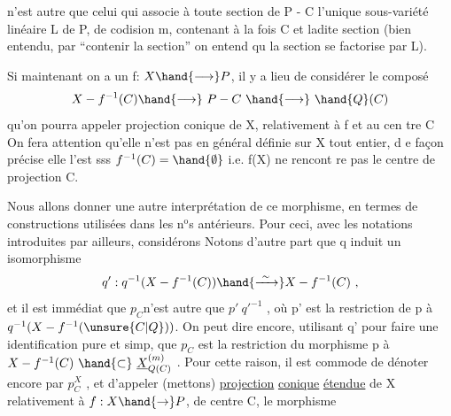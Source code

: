 
n'est autre que celui qui associe à toute section de  P - C  l'unique
sous-variété linéaire  L de P, de codision m, contenant à la fois C
et ladite section  (bien entendu, par ``contenir la section'' on entend qu
la section se factorise par L).

Si maintenant on a un f: $X \hand{\longrightarrow} P$,  il y a lieu de considérer le
composé
\[ X - f^{-1}(C) \hand{\longrightarrow}\ P - C \ \hand{\longrightarrow}\ \hand{Q}(C) \]
qu'on pourra appeler projection conique de X, relativement à f et au cen%
tre C\hand{,}  On fera attention qu'elle n'est pas en général définie sur X tout
entier, d e façon précise elle l'est sss $f^{-1}(C)=\hand{\emptyset}$ i.e. f(X) ne rencont re
pas le centre de projection C. \hand{\unsure{/|)}}

Nous allons donner une autre interprétation de ce morphisme, en
termes de constructions utilisées dans les n$^{\text{o}}$s antérieurs.  Pour ceci,
avec les notations introduites par ailleurs, considérons
\diagram{\[
\begin{array}{ccc}
X & \overset{q}{\hand{\longleftarrow}} & \underline{X}^{(m)}_{\unsure{Q|G}(C)} = \underline{X}^{(m)}x_{\mathrm{Grass}^{m}}\hand{Q}(C) \\
 & & p\xout{\unsure{z}}\quad\hand{\downarrow} \\
 & & \hand{Q}(C) \quad .
\end{array}
\]}
Notons d'autre part que  q  induit un  isomorphisme
\[ q':q^{-1}(X-f^{-1}(C)) \hand{\xrightarrow{\ \sim\ }} X - f^{-1}(C) \ , \]
et il est immédiat que  $p_{C}$n'est autre  que   $p'\ q'^{-1}$ , où p' est la
restriction de  p à  $q^{-1}(X-f^{-1}(\unsure{C|Q}))$.  On peut dire encore, utilisant q'
pour faire une identification pure et simp, que  $p_{C}$ est la restriction
du morphisme p  à  $X - f^{-1}(C) \ \hand{\subset}\ \underline{X}^{(m)}_{Q(C)}$ . Pour cette raison, il est
commode de dénoter encore par  $p^{X}_{C}$ , et d'appeler  (mettons)  \uline{projection}
\uline{conique}  \uline{étendue}  de X\hand{,} relativement à $f:X\hand{\rightarrow} P$, de centre C, le morphisme

